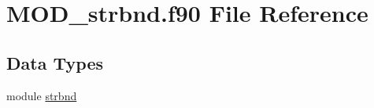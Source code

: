 \hypertarget{MOD__strbnd_8f90}{\section{M\-O\-D\-\_\-strbnd.\-f90 File Reference}
\label{MOD__strbnd_8f90}
}
\subsection*{Data Types}
\begin{DoxyCompactItemize}
\item 
module \hyperlink{classstrbnd}{strbnd}
\end{DoxyCompactItemize}

